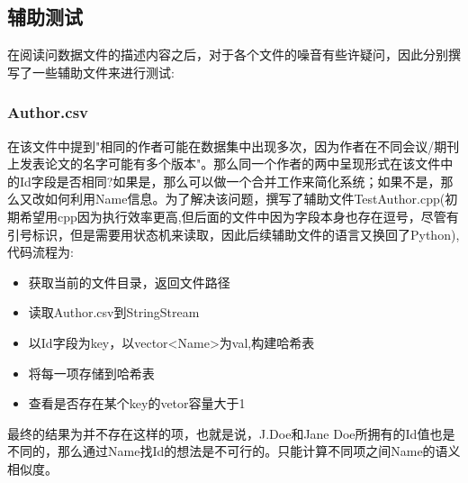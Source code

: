 \documentclass{mcmthesis}
\begin{document}
	\subsection{辅助测试}
	\par 在阅读问数据文件的描述内容之后，对于各个文件的噪音有些许疑问，因此分别撰写了一些辅助文件来进行测试:
		\subsubsection{Author.csv}
		\par 在该文件中提到"相同的作者可能在数据集中出现多次，因为作者在不同会议/期刊上发表论文的名字可能有多个版本"。那么同一个作者的两中呈现形式在该文件中的Id字段是否相同?如果是，那么可以做一个合并工作来简化系统；如果不是，那么又改如何利用Name信息。为了解决该问题，撰写了辅助文件TestAuthor.cpp(初期希望用cpp因为执行效率更高,但后面的文件中因为字段本身也存在逗号，尽管有引号标识，但是需要用状态机来读取，因此后续辅助文件的语言又换回了Python),代码流程为:
		\begin{itemize}
			\item 获取当前的文件目录，返回文件路径
			\item 读取Author.csv到StringStream
			\item 以Id字段为key，以vector<Name>为val,构建哈希表
			\item 将每一项存储到哈希表
			\item 查看是否存在某个key的vetor容量大于1
		\end{itemize}
		\par 最终的结果为并不存在这样的项，也就是说，J.Doe和Jane Doe所拥有的Id值也是不同的，那么通过Name找Id的想法是不可行的。只能计算不同项之间Name的语义相似度。
\end{document}
